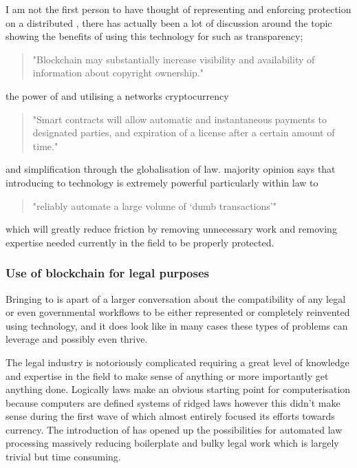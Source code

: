 I am not the first person to have thought of representing and enforcing  protection on a distributed , there has actually been a lot of discussion around the topic showing the benefits of using this technology for  such as transparency; \begin{quote} "Blockchain may substantially increase visibility and availability of information about copyright ownership." \cite{Copyright_in_the_blockchain_era} \end{quote} the power of  and utilising a networks cryptocurrency \begin{quote} "Smart contracts will allow automatic and instantaneous payments to designated parties, and expiration of a license after a certain amount of time." \cite{Copyright_in_the_blockchain_era} \end{quote} and simplification through the globalisation of  law. majority opinion says that introducing  to  technology is extremely powerful particularly within  law to \begin{quote}"reliably automate a large volume of ‘dumb transactions’" \cite{missing_link_in_copyright_licensing}\end{quote} which will greatly reduce friction by removing unnecessary work and removing expertise needed currently in the field to be properly protected.

\subsubsection{Use of blockchain for legal purposes}

Bringing  to  is apart of a larger conversation about the compatibility of any legal or even governmental workflows to be either represented or completely reinvented using  technology, and it does look like in many cases these types of problems can leverage  and possibly even thrive.

The legal industry is notoriously complicated requiring a great level of knowledge and expertise in the field to make sense of anything or more importantly get anything done. Logically laws make an obvious starting point for computerisation because computers are defined systems of ridged laws however this didn't make sense during the first wave of  which almost entirely focused its efforts towards currency. The introduction of  has opened up the possibilities for automated law processing massively reducing boilerplate and bulky legal work which is largely trivial but time consuming.

